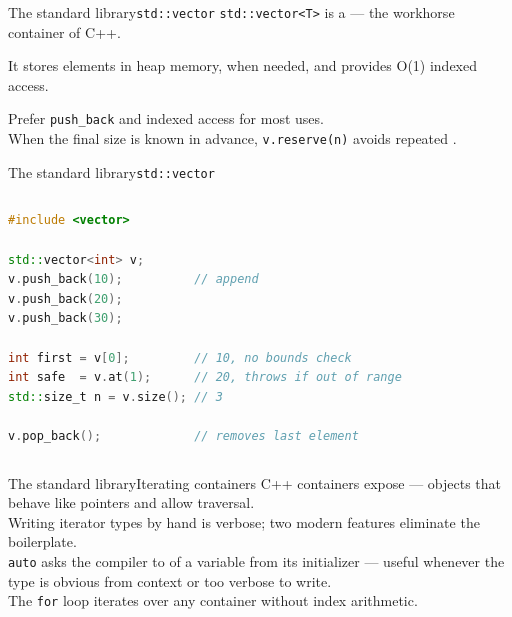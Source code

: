 \begin{frame}{The standard library}{\texttt{std::vector}}
	\justifying
	\texttt{std::vector<T>} is a  — the workhorse container of C++.\\
  \bigskip

	It stores elements  in heap memory,  when needed, and provides O(1) indexed access.\\
  \bigskip
	
	Prefer \texttt{push\_back} and indexed access for most uses.\\
	When the final size is known in advance, \texttt{v.reserve(n)} avoids repeated .
\end{frame}
\begin{frame}[fragile]{The standard library}{\texttt{std::vector}}
  \begin{columns}
		\begin{lstlisting}[style=codebeamer, language=C++, caption=Basic \texttt{std::vector} operations.]
#include <vector>

std::vector<int> v;
v.push_back(10);          // append
v.push_back(20);
v.push_back(30);

int first = v[0];         // 10, no bounds check
int safe  = v.at(1);      // 20, throws if out of range
std::size_t n = v.size(); // 3

v.pop_back();             // removes last element
    \end{lstlisting}
	\end{columns}
\end{frame}
\begin{frame}{The standard library}{Iterating containers}
	\justifying
	C++ containers expose  — objects that behave like pointers and allow traversal.\\
	Writing iterator types by hand is verbose; two modern features eliminate the boilerplate.\\
	\bigskip
	\texttt{auto} asks the compiler to  of a variable from its initializer — useful whenever the type is obvious from context or too verbose to write.\\
	\bigskip
	The  \texttt{for} loop iterates over any container without index arithmetic.
\end{frame}
